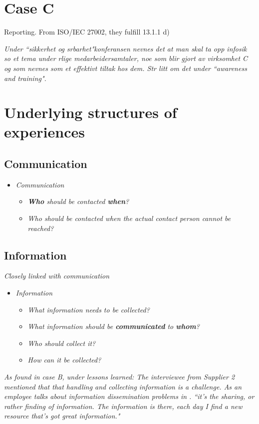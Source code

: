 \section{Case C}

Reporting. From ISO/IEC 27002, they fulfill 13.1.1 d)

\textit{Under ``sikkerhet og srbarhet"konferansen nevnes det at man skal ta opp infosik so et tema under rlige medarbeidersamtaler, noe som blir gjort av virksomhet C og som nevnes som et effektivt tiltak hos dem. Str litt om det under ``awareness and training".}

\section{Underlying structures of experiences}
\subsection{Communication}
\begin{itemize}
\item \textit{Communication}
\begin{itemize}
\item \textit{\textbf{Who} should be contacted \textbf{when}?}
\item \textit{Who should be contacted when the actual contact person cannot be reached?}
\end{itemize}
\end{itemize}

\subsection{Information}
\textit{Closely linked with communication}

\begin{itemize}
\item \textit{Information}
\begin{itemize}
\item \textit{What information needs to be collected?}
\item \textit{What information should be \textbf{communicated} to \textbf{whom}?}
\item \textit{Who should collect it?}
\item \textit{How can it be collected?}
\end{itemize}
\end{itemize}

\textit{As found in case B, under lessons learned:
The interviewee from Supplier 2 mentioned that that handling and collecting information is a challenge. As an employee talks about information dissemination problems in \cite{ahmad2012incident}.
``it's the sharing, or rather finding of information. The information is there, each day I find a new resource that's got great information."}

